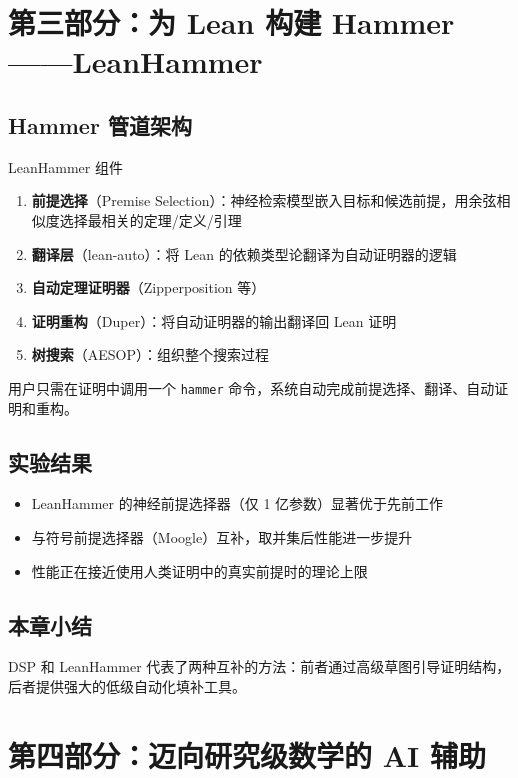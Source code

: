 \documentclass[a4paper]{article}
\begin{document}
\section{第三部分：为 Lean 构建 Hammer——LeanHammer}

\subsection{Hammer 管道架构}

\begin{importantbox}{LeanHammer 组件}
\begin{enumerate}
    \item \textbf{前提选择}（Premise Selection）：神经检索模型嵌入目标和候选前提，用余弦相似度选择最相关的定理/定义/引理
    \item \textbf{翻译层}（lean-auto）：将 Lean 的依赖类型论翻译为自动证明器的逻辑
    \item \textbf{自动定理证明器}（Zipperposition 等）
    \item \textbf{证明重构}（Duper）：将自动证明器的输出翻译回 Lean 证明
    \item \textbf{树搜索}（AESOP）：组织整个搜索过程
\end{enumerate}
\end{importantbox}

用户只需在证明中调用一个 \texttt{hammer} 命令，系统自动完成前提选择、翻译、自动证明和重构。

\subsection{实验结果}

\begin{itemize}
    \item LeanHammer 的神经前提选择器（仅 1 亿参数）显著优于先前工作
    \item 与符号前提选择器（Moogle）互补，取并集后性能进一步提升
    \item 性能正在接近使用人类证明中的真实前提时的理论上限
\end{itemize}

\subsection{本章小结}

DSP 和 LeanHammer 代表了两种互补的方法：前者通过高级草图引导证明结构，后者提供强大的低级自动化填补工具。

\section{第四部分：迈向研究级数学的 AI 辅助}
\end{document}
